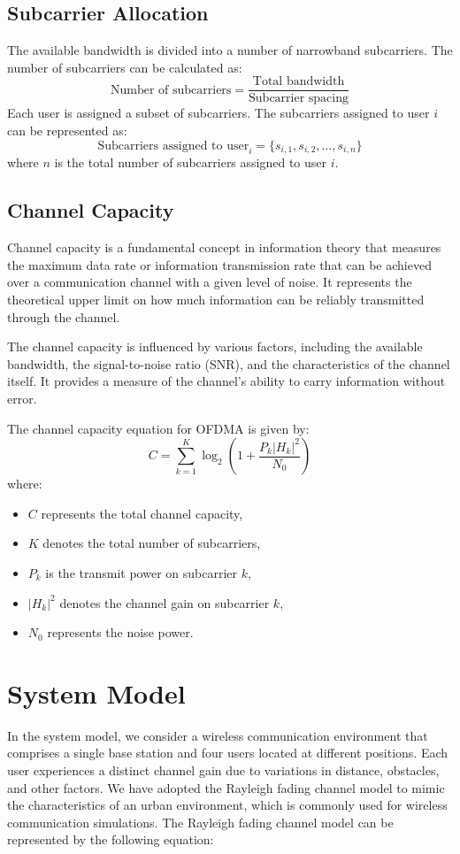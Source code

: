 \documentclass[conference]{IEEEtran}
\begin{document}
\subsection{Subcarrier Allocation}

The available bandwidth is divided into a number of narrowband subcarriers. The number of subcarriers can be calculated as:
$$
\text{{Number of subcarriers}} = \frac{{\text{{Total bandwidth}}}}{{\text{{Subcarrier spacing}}}}
$$
Each user is assigned a subset of subcarriers. The subcarriers assigned to user \(i\) can be represented as:
$$
\text{{Subcarriers assigned to user}}_i = \{s_{i,1}, s_{i,2}, \ldots, s_{i,n}\}
$$
where \(n\) is the total number of subcarriers assigned to user \(i\).

\subsection{Channel Capacity}
Channel capacity is a fundamental concept in information theory that measures the maximum data rate or information transmission rate that can be achieved over a communication channel with a given level of noise. It represents the theoretical upper limit on how much information can be reliably transmitted through the channel.

The channel capacity is influenced by various factors, including the available bandwidth, the signal-to-noise ratio (SNR), and the characteristics of the channel itself. It provides a measure of the channel's ability to carry information without error.

The channel capacity equation for OFDMA is given by:
$$
C = \sum_{k=1}^{K} \log_2 \left(1 + \frac{P_k |H_k|^2}{N_0}\right)
$$
where:
\begin{itemize}
  \item $C$ represents the total channel capacity,
  \item $K$ denotes the total number of subcarriers,
  \item $P_k$ is the transmit power on subcarrier $k$,
  \item $|H_k|^2$ denotes the channel gain on subcarrier $k$,
  \item $N_0$ represents the noise power.
\end{itemize}

\section{System Model}
In the system model, we consider a wireless communication environment that comprises a single base station and four users located at different positions. Each user experiences a distinct channel gain due to variations in distance, obstacles, and other factors. We have adopted the Rayleigh fading channel model to mimic the characteristics of an urban environment, which is commonly used for wireless communication simulations.
The Rayleigh fading channel model can be represented by the following equation:
\end{document}
